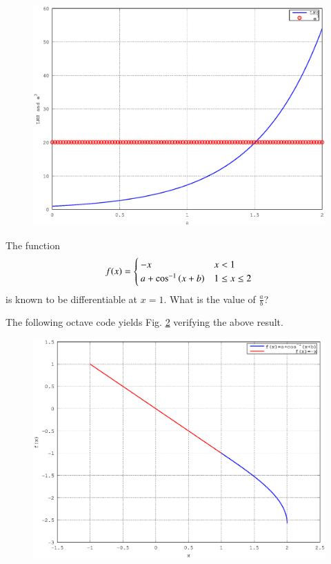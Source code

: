 \documentclass[journal,12pt,twocolumn]{IEEEtran}
\begin{document}
\begin{figure}[!ht]
\begin{center}
\includegraphics[width=\columnwidth]{./figs/ee16b1004}
\end{center}
\label{fig_4}	
\end{figure}
\begin{problem}
The function
%
\begin{equation}
f(x)=
\begin{cases}
-x & x < 1 \\
a + \cos^{-1}\left(x + b\right) & 1 \leq x \leq 2
\end{cases}
\end{equation}
%
is known to be differentiable at $x=1$.  What is the value of $\frac{a}{b}$?
\end{problem}
\solution

The following octave code yields Fig. \ref{fig_5} verifying the above result.

\begin{figure}[!ht]
\begin{center}
\includegraphics[width=\columnwidth]{./figs/ee16b1005}
\end{center}
\label{fig_5}	
\end{figure}
\end{document}
